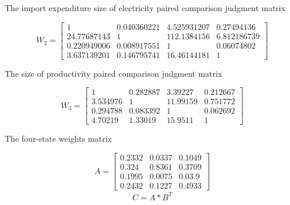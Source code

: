 \begin{center}
	The import expenditure size of electricity  paired comparison judgment matrix
\end{center}
\[ W_{2}=\begin{bmatrix}
1&	0.040360221	&4.525931207&	0.27494136\\
24.77687143	&1&	112.1384156&	6.812186739\\
0.220949006&	0.008917551&	1&	0.06074802\\
3.637139201&	0.146795741&	16.46144181&	1
\end{bmatrix} \] 
\begin{center}
	The size of productivity paired comparison judgment matrix
\end{center}
\[W_{3}= \begin{bmatrix}
	1 & 0.282887 & 3.39227 & 0.212667 \\ 
	3.534976 & 1 & 11.99159 & 0.751772 \\ 
	0.294788 & 0.083392 & 1 & 0.062692 \\ 
	4.70219 & 1.33019 & 15.9511 & 1
\end{bmatrix}  \]
\begin{center}
	The four-state weights matrix
\end{center}
\[ A= \begin{bmatrix}
0.2332 & 0.0337 & 0.1049\\ 
0.324 & 0.8361 & 0.3709 \\ 
0.1995 & 0.0075 & 0.03.9 \\ 
0.2432& 0.1227& 0.4933
\end{bmatrix}\]
\begin{gather}
C=A*B^{T}
\end{gather}

